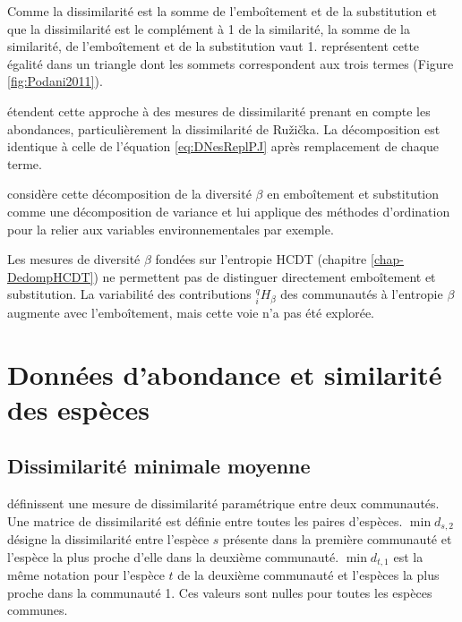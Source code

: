 \documentclass[
  11pt,
  french,
  a4paper,
  extrafontsizes,onecolumn,openright
  ]{memoir}
\begin{document}
\normalsize

Comme la dissimilarité est la somme de l'emboîtement et de la substitution et que la dissimilarité est le complément à 1 de la similarité, la somme de la similarité, de l'emboîtement et de la substitution vaut 1.
\textcite{Podani2011} représentent cette égalité dans un triangle dont les sommets correspondent aux trois termes (Figure \ref{fig:Podani2011}).

\textcite{Podani2013} étendent cette approche à des mesures de dissimilarité prenant en compte les abondances, particulièrement la dissimilarité de Ružička.
La décomposition est identique à celle de l'équation \eqref{eq:DNesReplPJ} après remplacement de chaque terme.

\textcite{Legendre2014} considère cette décomposition de la diversité \(\beta\) en emboîtement et substitution comme une décomposition de variance et lui applique des méthodes d'ordination pour la relier aux variables environnementales par exemple.

Les mesures de diversité \(\beta\) fondées sur l'entropie HCDT (chapitre \ref{chap-DedompHCDT}) ne permettent pas de distinguer directement emboîtement et substitution.
La variabilité des contributions \(^{q}_{i}\!H_{\beta}\) des communautés à l'entropie \(\beta\) augmente avec l'emboîtement, mais cette voie n'a pas été explorée.

\section{Données d'abondance et similarité des espèces}\label{donnuxe9es-dabondance-et-similarituxe9-des-espuxe8ces}

\subsection{Dissimilarité minimale moyenne}\label{dissimilarituxe9-minimale-moyenne}

\textcite{Ricotta2010} définissent une mesure de dissimilarité paramétrique entre deux communautés.
Une matrice de dissimilarité est définie entre toutes les paires d'espèces.
\(\min{d_{s,2}}\) désigne la dissimilarité entre l'espèce \(s\) présente dans la première communauté et l'espèce la plus proche d'elle dans la deuxième communauté.
\(\min{d_{t,1}}\) est la même notation pour l'espèce \(t\) de la deuxième communauté et l'espèces la plus proche dans la communauté 1.
Ces valeurs sont nulles pour toutes les espèces communes.
\end{document}
